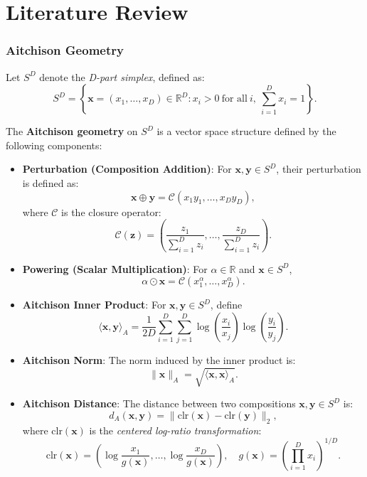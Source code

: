 \documentclass[
	12pt,				%
	oneside,			%
	a4paper,			%
	english,			%
	brazil				%
	]{abntex2ppgsi}
\begin{document}
\chapter{Literature Review}



\subsection*{Aitchison Geometry}

Let $S^D$ denote the \emph{D-part simplex}, defined as:
\[
S^D = \left\{ \mathbf{x} = (x_1, \dots, x_D) \in \mathbb{R}^D : x_i > 0 \ \text{for all} \ i, \ \sum_{i=1}^D x_i = 1 \right\}.
\]

The \textbf{Aitchison geometry} on $S^D$ is a vector space structure defined by the following components:

\begin{itemize}
    \item \textbf{Perturbation (Composition Addition)}: For $\mathbf{x}, \mathbf{y} \in S^D$, their perturbation is defined as:
    \[
    \mathbf{x} \oplus \mathbf{y} = \mathcal{C}(x_1 y_1, \dots, x_D y_D),
    \]
    where $\mathcal{C}$ is the closure operator:
    \[
    \mathcal{C}(\mathbf{z}) = \left( \frac{z_1}{\sum_{i=1}^D z_i}, \dots, \frac{z_D}{\sum_{i=1}^D z_i} \right).
    \]
    
    \item \textbf{Powering (Scalar Multiplication)}: For $\alpha \in \mathbb{R}$ and $\mathbf{x} \in S^D$,
    \[
    \alpha \odot \mathbf{x} = \mathcal{C}(x_1^\alpha, \dots, x_D^\alpha).
    \]
    
    \item \textbf{Aitchison Inner Product}: For $\mathbf{x}, \mathbf{y} \in S^D$, define
    \[
    \langle \mathbf{x}, \mathbf{y} \rangle_A = \frac{1}{2D} \sum_{i=1}^D \sum_{j=1}^D \log\left(\frac{x_i}{x_j}\right) \log\left(\frac{y_i}{y_j}\right).
    \]
    
    \item \textbf{Aitchison Norm}: The norm induced by the inner product is:
    \[
    \|\mathbf{x}\|_A = \sqrt{\langle \mathbf{x}, \mathbf{x} \rangle_A}.
    \]
    
    \item \textbf{Aitchison Distance}: The distance between two compositions $\mathbf{x}, \mathbf{y} \in S^D$ is:
    \[
    d_A(\mathbf{x}, \mathbf{y}) = \|\text{clr}(\mathbf{x}) - \text{clr}(\mathbf{y})\|_2,
    \]
    where $\text{clr}(\mathbf{x})$ is the \emph{centered log-ratio transformation}:
    \[
    \text{clr}(\mathbf{x}) = \left( \log\frac{x_1}{g(\mathbf{x})}, \dots, \log\frac{x_D}{g(\mathbf{x})} \right), \quad g(\mathbf{x}) = \left( \prod_{i=1}^D x_i \right)^{1/D}.
    \]
\end{itemize}
\end{document}
